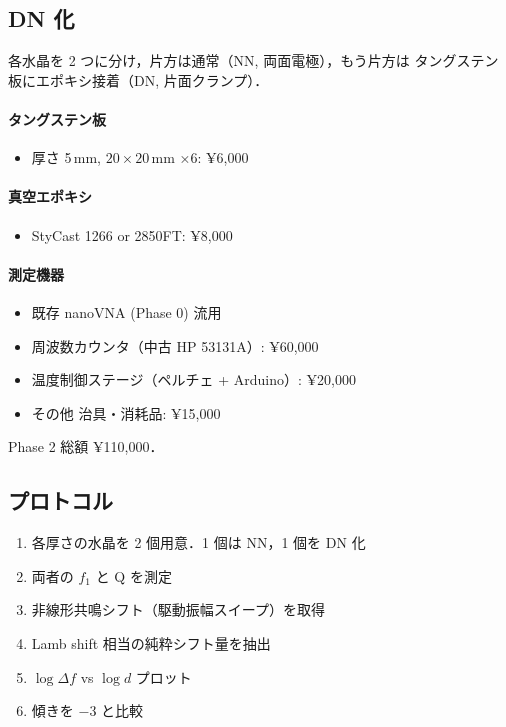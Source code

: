 \documentclass[11pt,a4paper]{article}
\begin{document}
\subsection{DN 化}

各水晶を 2 つに分け，片方は通常（NN, 両面電極），もう片方は
タングステン板にエポキシ接着（DN, 片面クランプ）．

\paragraph{タングステン板}
\begin{itemize}
\item 厚さ 5\,mm, $20\times 20$\,mm ×6: ¥6,000
\end{itemize}

\paragraph{真空エポキシ}
\begin{itemize}
\item StyCast 1266 or 2850FT: ¥8,000
\end{itemize}

\paragraph{測定機器}
\begin{itemize}
\item 既存 nanoVNA (Phase 0) 流用
\item 周波数カウンタ（中古 HP 53131A）: ¥60,000
\item 温度制御ステージ（ペルチェ + Arduino）: ¥20,000
\item その他 治具・消耗品: ¥15,000
\end{itemize}

Phase 2 総額 ¥110,000．

\subsection{プロトコル}

\begin{enumerate}
\item 各厚さの水晶を 2 個用意．1 個は NN，1 個を DN 化
\item 両者の $f_1$ と Q を測定
\item 非線形共鳴シフト（駆動振幅スイープ）を取得
\item Lamb shift 相当の純粋シフト量を抽出
\item $\log\Delta f$ vs $\log d$ プロット
\item 傾きを $-3$ と比較
\end{enumerate}
\end{document}

